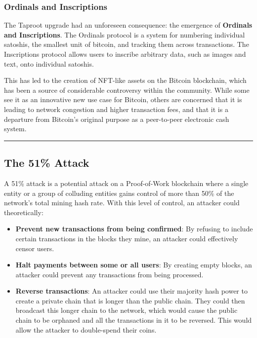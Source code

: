 \subsubsection{Ordinals and
	Inscriptions}\label{ordinals-and-inscriptions}

The Taproot upgrade had an unforeseen consequence: the emergence of
\textbf{Ordinals and Inscriptions}. The Ordinals protocol is a system
for numbering individual satoshis, the smallest unit of bitcoin, and
tracking them across transactions. The Inscriptions protocol allows
users to inscribe arbitrary data, such as images and text, onto
individual satoshis.

This has led to the creation of NFT-like assets on the Bitcoin
blockchain, which has been a source of considerable controversy within
the community. While some see it as an innovative new use case for
Bitcoin, others are concerned that it is leading to network congestion
and higher transaction fees, and that it is a departure from Bitcoin's
original purpose as a peer-to-peer electronic cash system.

\begin{center}\rule{0.5\linewidth}{0.5pt}\end{center}

\subsection{The 51\% Attack}\label{section-3-blockchain-forks-and-network-security}

A 51\% attack is a potential attack on a Proof-of-Work blockchain where
a single entity or a group of colluding entities gains control of more
than 50\% of the network's total mining hash rate. With this level of
control, an attacker could theoretically:

\begin{itemize}
	\tightlist
	\item
	\textbf{Prevent new transactions from being confirmed}: By refusing to
	include certain transactions in the blocks they mine, an attacker
	could effectively censor users.
	\item
	\textbf{Halt payments between some or all users}: By creating empty
	blocks, an attacker could prevent any transactions from being
	processed.
	\item
	\textbf{Reverse transactions}: An attacker could use their majority
	hash power to create a private chain that is longer than the public
	chain. They could then broadcast this longer chain to the network,
	which would cause the public chain to be orphaned and all the
	transactions in it to be reversed. This would allow the attacker to
	double-spend their coins.
\end{itemize}


